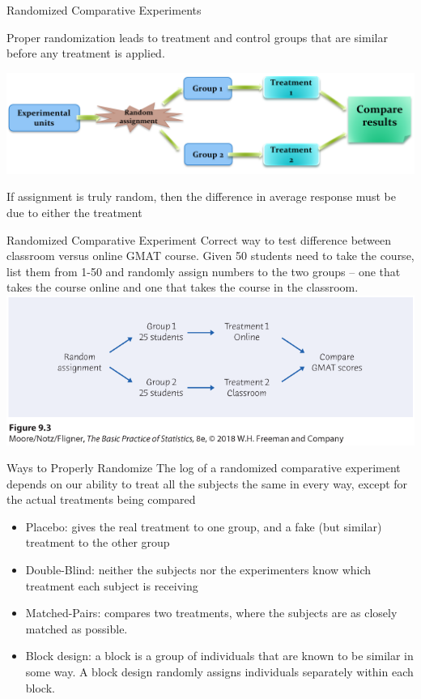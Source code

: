 \documentclass{beamer}
\begin{document}
\begin{frame}{Randomized Comparative Experiments}
	
	Proper \alert{randomization} leads to treatment and control groups that are similar before any treatment is applied. 
	
	\includegraphics[width=\textwidth]{randomassignment}
	
	If assignment is truly random, then the difference in average response must be due to either the treatment 
	
\end{frame}

\begin{frame}{Randomized Comparative Experiment}
	Correct way to test difference between classroom versus online GMAT course. Given 50 students need to take the course, list them from 1-50 and randomly assign numbers to the two groups -- one that takes the course online and one that takes the course in the classroom. 
	\includegraphics[width=\textwidth]{randomized_GMAT}
\end{frame}


\begin{frame}{Ways to Properly Randomize}
	The log of a randomized comparative experiment depends on our ability to treat all the subjects the same in every way, except for the actual treatments being compared
	\begin{itemize}
		\item \alert{Placebo}: gives the real treatment to one group, and a fake (but similar) treatment to the other group
		\item \alert{Double-Blind}: neither the subjects nor the experimenters know which treatment each subject is receiving 
		\item \alert{Matched-Pairs}: compares two treatments, where the subjects are as closely matched as possible. 
		\item \alert{Block design}: a block is a group of individuals that are known to be similar in some way. A block design randomly assigns individuals separately within each block. 
	\end{itemize}
\end{frame}
\end{document}
